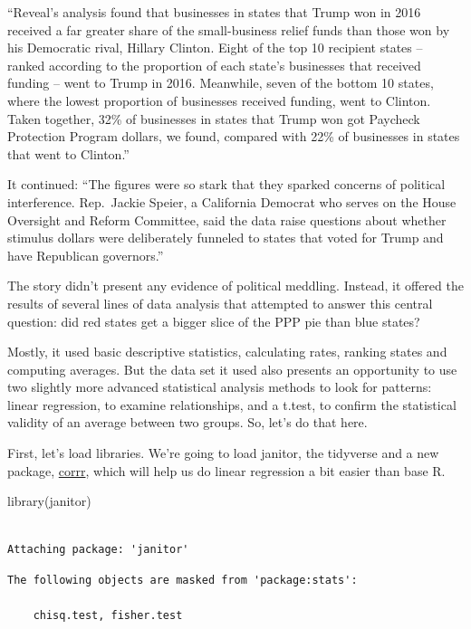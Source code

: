 \documentclass[
  letterpaper,
  DIV=11,
  numbers=noendperiod]{scrreprt}
\newenvironment{Shaded}{\begin{snugshade}}{\end{snugshade}}
\newcommand{\FunctionTok}[1]{\textcolor[rgb]{0.28,0.35,0.67}{#1}}
\newcommand{\NormalTok}[1]{\textcolor[rgb]{0.00,0.23,0.31}{#1}}
\begin{document}
``Reveal's analysis found that businesses in states that Trump won in
2016 received a far greater share of the small-business relief funds
than those won by his Democratic rival, Hillary Clinton. Eight of the
top 10 recipient states -- ranked according to the proportion of each
state's businesses that received funding -- went to Trump in 2016.
Meanwhile, seven of the bottom 10 states, where the lowest proportion of
businesses received funding, went to Clinton. Taken together, 32\% of
businesses in states that Trump won got Paycheck Protection Program
dollars, we found, compared with 22\% of businesses in states that went
to Clinton.''

It continued: ``The figures were so stark that they sparked concerns of
political interference. Rep.~Jackie Speier, a California Democrat who
serves on the House Oversight and Reform Committee, said the data raise
questions about whether stimulus dollars were deliberately funneled to
states that voted for Trump and have Republican governors.''

The story didn't present any evidence of political meddling. Instead, it
offered the results of several lines of data analysis that attempted to
answer this central question: did red states get a bigger slice of the
PPP pie than blue states?

Mostly, it used basic descriptive statistics, calculating rates, ranking
states and computing averages. But the data set it used also presents an
opportunity to use two slightly more advanced statistical analysis
methods to look for patterns: linear regression, to examine
relationships, and a t.test, to confirm the statistical validity of an
average between two groups. So, let's do that here.

First, let's load libraries. We're going to load janitor, the tidyverse
and a new package, \href{https://corrr.tidymodels.org/}{corrr}, which
will help us do linear regression a bit easier than base R.

\begin{Shaded}
\begin{Highlighting}[]
\FunctionTok{library}\NormalTok{(janitor)}
\end{Highlighting}
\end{Shaded}

\begin{verbatim}

Attaching package: 'janitor'
\end{verbatim}

\begin{verbatim}
The following objects are masked from 'package:stats':

    chisq.test, fisher.test
\end{verbatim}
\end{document}
